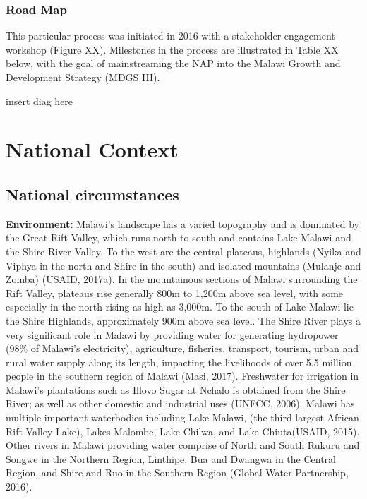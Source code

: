\documentclass[
]{book}
\begin{document}
\hypertarget{road-map}{%
\subsection{Road Map}\label{road-map}}

This particular process was initiated in 2016 with a stakeholder engagement workshop (Figure XX). Milestones in the process are illustrated in Table XX below,
with the goal of mainstreaming the NAP into the Malawi Growth and Development Strategy (MDGS III).

insert diag here

\hypertarget{national-context}{%
\chapter{National Context}\label{national-context}}

\hypertarget{national-circumstances}{%
\section{National circumstances}\label{national-circumstances}}

\textbf{Environment:} Malawi's landscape has a varied topography and is dominated by the Great Rift Valley, which runs north to south and contains Lake Malawi and the Shire River Valley. To the west are the central plateaus, highlands (Nyika and Viphya in the north and Shire in the south) and isolated mountains (Mulanje and Zomba) (USAID, 2017a). In the mountainous sections of Malawi surrounding the Rift Valley, plateaus rise generally 800m to 1,200m above sea level, with some especially in the north rising as high as 3,000m. To the south of Lake Malawi lie the Shire Highlands, approximately 900m above sea level. The Shire River plays a very significant role in Malawi by providing water for generating hydropower (98\% of Malawi's electricity), agriculture, fisheries, transport, tourism, urban and rural water supply along its length, impacting the livelihoods of over 5.5 million people in the southern region of Malawi (Masi, 2017). Freshwater for irrigation in Malawi's plantations such as Illovo Sugar at Nchalo is obtained from the Shire River; as well as other domestic and industrial uses (UNFCC, 2006). Malawi has multiple important waterbodies including Lake Malawi, (the third largest African Rift Valley Lake), Lakes Malombe, Lake Chilwa, and Lake Chiuta(USAID, 2015). Other rivers in Malawi providing water comprise of North and South Rukuru and Songwe in the Northern Region, Linthipe, Bua and Dwangwa in the Central Region, and Shire and Ruo in the Southern Region (Global Water Partnership, 2016).
\end{document}
